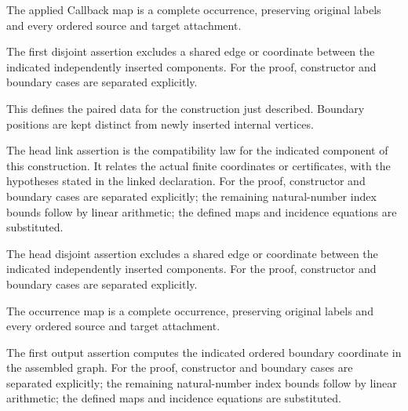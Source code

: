 The applied Callback map is a complete occurrence, preserving original labels and every ordered source and target attachment.
\par{}

The first disjoint assertion excludes a shared edge or coordinate between the indicated independently inserted components.
For the proof, constructor and boundary cases are separated explicitly.
\par{}

This defines the paired data for the construction just described. Boundary positions are kept distinct from newly inserted internal vertices.
\par{}

The head link assertion is the compatibility law for the indicated component of this construction. It relates the actual finite coordinates or certificates, with the hypotheses stated in the linked declaration.
For the proof, constructor and boundary cases are separated explicitly; the remaining natural-number index bounds follow by linear arithmetic; the defined maps and incidence equations are substituted.
\par{}

The head disjoint assertion excludes a shared edge or coordinate between the indicated independently inserted components.
For the proof, constructor and boundary cases are separated explicitly.
\par{}

The occurrence map is a complete occurrence, preserving original labels and every ordered source and target attachment.
\par{}

The first output assertion computes the indicated ordered boundary coordinate in the assembled graph.
For the proof, constructor and boundary cases are separated explicitly; the remaining natural-number index bounds follow by linear arithmetic; the defined maps and incidence equations are substituted.
\par{}

